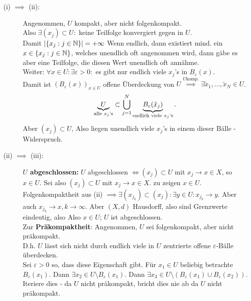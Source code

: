 \begin{subproof*}
	\begin{description}
		\item[(i) $ \implies  $ (ii):] Angenommen, $ U $ kompakt, aber nicht folgenkompakt.\\
			Also $ \exists (x_j) \subset U :  $ keine Teilfolge konvergiert gegen in $ U $.\\
			Damit $ \left| \left\{ x_j : j \in \mathbb{N}  \right\}  \right| = +\infty $ Wenn endlich, dann existiert mind. ein $ x \in \left\{ x_j : j \in \mathbb{N}  \right\} $, welches unendlich oft angenommen wird, dann gäbe es aber eine Teilfolge, die diesen Wert unendlich oft annähme.\\
			Weiter: $ \forall x \in U : \exists  \varepsilon > 0 : $ es gibt nur endlich viele $ x_j $'s in $ B_{\varepsilon}(x)  $.\\
			Damit ist $ \left( B_{\varepsilon}(x)  \right) _{x \in U}  $ offene Überdeckung von $ U \overset{U \text{komp.} }{\implies } \exists \tilde x_1, \dotsc, \tilde x_N \in U $.
			\[
				\underbrace{U}_{\text{alle $ x_j $'s}} \subset \bigcup_{j = 1} ^N \underbrace{B_{\varepsilon}(\tilde x_j) }_{\text{endlich viele $ x_j $'s} }.
			\]
			Aber $ (x_j) \subset U $,
			Also liegen unendlich viele $ x_j $'s in einem dieser Bälle - Widerspruch.
		\item[(ii) $ \implies  $ (iii):] \textbf{$ U $ abgeschlossen:} $ U $ abgeschlossen $ \iff (x_j) \subset U $ mit $ x_j \to x \in X $, so $ x \in U $.
			Sei also $ (x_j) \subset U $ mit $ x_j \to x \in X $. zu zeigen $ x \in U $.\\
			Folgenkompaktheit aus (ii) $ \implies \exists (x_{j_k} ) \subset (x_j) : \exists y \in U : x_{j_k} \to y $.
			Aber auch $ x_{j_k} \to x, k \to \infty $. Aber $ (X, d) $ Hausdorff, also sind Grenzwerte eindeutig,
			also 
			Also $ x \in U $; $ U $ ist abgeschlossen.\\
			Zur \textbf{Präkompaktheit}:
			Angenommen, $ U $ sei folgenkompakt, aber nicht präkompakt.\\
			D.h. $ U $ lässt sich nicht durch endlich viele in $ U $ zentrierte offene $ \varepsilon  $-Bälle überdecken.\\
			Sei $ \varepsilon > 0 $ so, dass diese Eigenschaft gibt.
			Für $ x_1 \in U $ beliebig betrachte $ B_{\varepsilon}(x_1)  $.
			Dann $ \exists x_2 \in U \setminus B_{\varepsilon}(x_1)  $.
			Dann $ \exists x_3 \in U \setminus \left( B_{\varepsilon}(x_1) \cup B_{\varepsilon}(x_2)  \right)  $.
			Iteriere dies - da $ U $ nicht präkompakt, bricht dies nie ab da $ U $ nicht präkompakt.\\

\end{description}
\end{subproof*}
